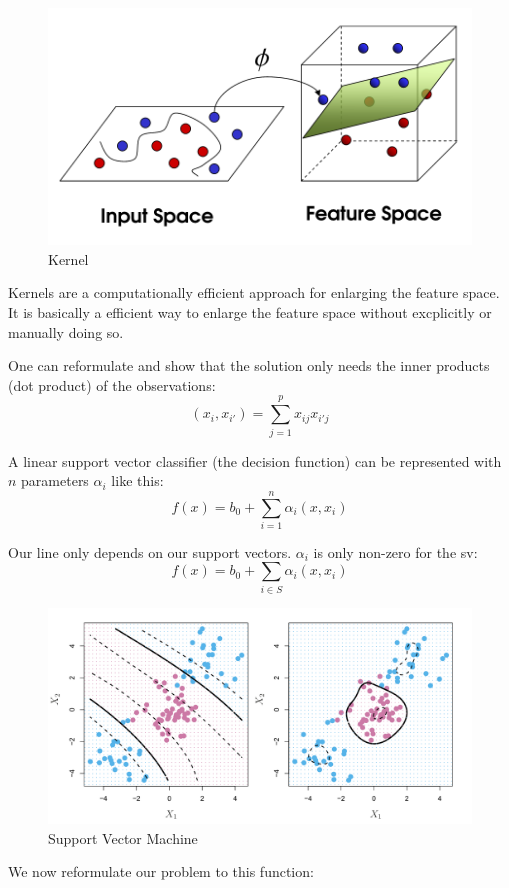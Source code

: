 \documentclass[../Main.tex]{subfiles}
\begin{document}
\begin{figure}[H]
    \centering
    \includegraphics[width=0.5\linewidth]{Images/kernel.png}
    \caption{Kernel}
\end{figure}

Kernels are a computationally efficient approach for enlarging the feature space.
It is basically a efficient way to enlarge the feature space without excplicitly
or manually doing so.

One can reformulate and show that the solution
only needs the inner products (dot product) of the observations:
\begin{equation*}
    (x_i, x_{i'}) = \sum_{j=1}^{p} x_{ij} x_{i'j}
\end{equation*}

A linear support vector classifier (the decision function) can be represented with \(n\)
parameters \(\alpha_i\) like this:
\begin{equation*}
    f(x) = b_0 + \sum_{i=1}^{n} \alpha_i (x,x_i)
\end{equation*}

Our line only depends on our support vectors.
\(\alpha_i\) is only non-zero for the sv:
\begin{equation*}
    f(x) = b_0 + \sum_{i \in S} \alpha_i (x,x_i)
\end{equation*}

\begin{figure}[H]
    \centering
    \includegraphics[width=0.75\linewidth]{Images/svm.png}
    \caption{Support Vector Machine}
\end{figure}

We now reformulate our problem to this function:
\end{document}
